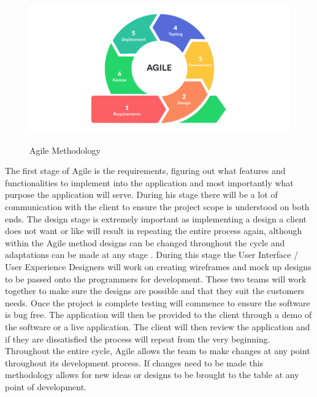 \begin{figure}[H]
  \centering
  \includegraphics[scale=0.35]{img/agile.jpg}
  \caption{Agile Methodology}\cite{agile}
  \label{fig:Agile Methodology}
\end{figure}

The first stage of Agile is the requirements, figuring out what features and functionalities to implement into the application and most importantly what purpose the application will serve. During his stage there will be a lot of communication with the client to ensure the project scope is understood on both ends. The design stage is extremely important as implementing a design a client does not want or like will result in repeating the entire process again, although within the Agile method designs can be changed throughout the cycle and adaptations can be made at any stage \cite{waterfall}. During this stage the User Interface / User Experience Designers will work on creating wireframes and mock up designs to be passed onto the programmers for development. These two teams will work together to make sure the designs are possible and that they suit the customers needs. Once the project is complete testing will commence to ensure the software is bug free. The application will then be provided to the client through a demo of the software or a live application. The client will then review the application and if they are dissatisfied the process will repeat from the very beginning. Throughout the entire cycle, Agile allows the team to make changes at any point throughout its development process. If changes need to be made this methodology allows for new ideas or designs to be brought to the table at any point of development. \cite{waterfall}

